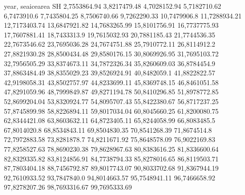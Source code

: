 year,    seaicearea SH
2,7553864.94
3,8217479.48
4,7028152.94
5,7182710.62
6,7473910.6
7,7435804.25
8,7506740.66
9,7262290.33
10,7479906.8
11,7288934.21
12,7173403.74
13,6847921.82
14,7683265.99
15,8101756.91
16,7737775.93
17,7607881.41
18,7433313.9
19,7615032.93
20,7881185.43
21,7744536.35
22,7673546.62
23,7695036.28
24,7674751.88
25,7910772.11
26,8114912.2
27,8821930.28
28,8500434.48
29,8580176.15
30,8069926.95
31,7695103.72
32,7956505.29
33,8374673.11
34,7872326.34
35,8260609.03
36,8784454.9
37,8863484.49
38,8355029.23
39,8526924.91
40,8482059.1
41,8822822.57
42,9198058.31
43,8502757.97
44,8233699.11
45,8369748.15
46,8461051.58
47,8291059.96
48,7999849.87
49,8271194.78
50,8410296.85
51,8978772.85
52,8699204.04
53,8320924.77
54,8095707.43
55,8422380.67
56,8717237.25
57,8745899.98
58,8226894.11
59,8017034.04
60,8045660.25
61,8200080.75
62,8344421.08
63,8603632.11
64,8723405.11
65,8244058.99
66,8083485.5
67,8014020.8
68,8534843.11
69,8504830.35
70,8541268.39
71,8674514.8
72,7972883.58
73,8281878.7
74,8211671.92
75,8648578.09
76,9022169.83
77,8258527.63
78,8690230.38
79,8628967.63
80,8383616.25
81,8336600.64
82,8329335.82
83,8124856.91
84,7738794.33
85,8278016.65
86,8119503.71
87,7803404.18
88,7456792.87
89,8017743.07
90,8033702.68
91,8367944.19
92,7610933.52
93,7847840.0
94,8014663.57
95,7548941.11
96,7466658.92
97,8278207.26
98,7693316.67
99,7695333.69
